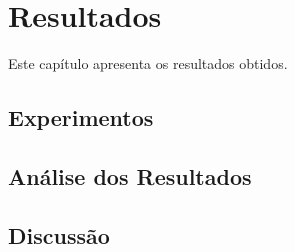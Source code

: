 \chapter{Resultados}
\label{cap:resultados}

Este capítulo apresenta os resultados obtidos.

\section{Experimentos}

\section{Análise dos Resultados}

\section{Discussão}
